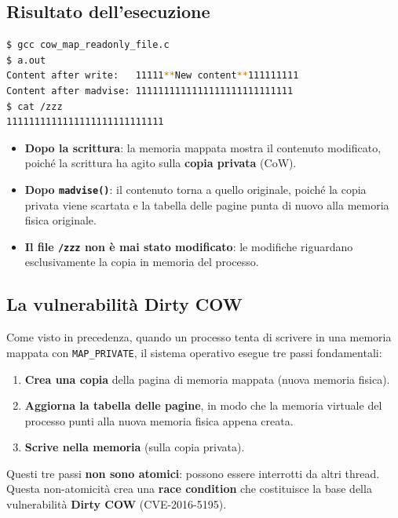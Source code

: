 \documentclass{article}
\begin{document}
\subsection*{Risultato dell'esecuzione}

\begin{lstlisting}[language=bash]
$ gcc cow_map_readonly_file.c
$ a.out
Content after write:   11111**New content**111111111
Content after madvise: 1111111111111111111111111111
$ cat /zzz
1111111111111111111111111111
\end{lstlisting}

\begin{itemize}
    \item \textbf{Dopo la scrittura}: la memoria mappata mostra il contenuto modificato, poiché la scrittura ha agito sulla \textbf{copia privata} (CoW).
    \item \textbf{Dopo \texttt{madvise()}}: il contenuto torna a quello originale, poiché la copia privata viene scartata e la tabella delle pagine punta di nuovo alla memoria fisica originale.
    \item \textbf{Il file \texttt{/zzz} non è mai stato modificato}: le modifiche riguardano esclusivamente la copia in memoria del processo.
\end{itemize}


\subsection*{La vulnerabilità Dirty COW}

Come visto in precedenza, quando un processo tenta di scrivere in una memoria mappata con \texttt{MAP\_PRIVATE}, il sistema operativo esegue tre passi fondamentali:

\begin{enumerate}[label=(\Alph*)]
    \item \textbf{Crea una copia} della pagina di memoria mappata (nuova memoria fisica).
    \item \textbf{Aggiorna la tabella delle pagine}, in modo che la memoria virtuale del processo punti alla nuova memoria fisica appena creata.
    \item \textbf{Scrive nella memoria} (sulla copia privata).
\end{enumerate}

Questi tre passi \textbf{non sono atomici}: possono essere interrotti da altri thread. Questa non-atomicità crea una \textbf{race condition} che costituisce la base della vulnerabilità \textbf{Dirty COW} (CVE-2016-5195).
\end{document}
